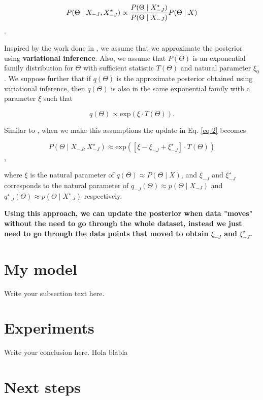 \documentclass{article}
\begin{document}
\begin{equation}
\label{eq-2}
P(\Theta \mid X_{-J}, X_{-J}^{\star}) \propto 
\frac{P(\Theta \mid X_{-J}^{\star})}{P(\Theta \mid X_{-J})}P(\Theta \mid X) \\
\end{equation}.

Inspired by the work done in \cite{streaming-variational-bayes}, we assume 
that we approximate the posterior using \textbf{variational inference}. Also,
we assume that $P(\Theta)$ is an exponential family distribution for $\Theta$
with sufficient statistic $T(\Theta)$ and natural parameter $\xi_0$. We suppose
further that if $q(\Theta)$ is the approximate posterior obtained using
variational inference, then $q(\Theta)$ is also in the same exponential family
with a parameter $\xi$ such that

\begin{equation}
\label{exponential-family}
q(\Theta) \propto \text{exp}(\xi \cdot T(\Theta)).
\end{equation}

Similar to \cite{streaming-variational-bayes}, when we make this assumptions
the update in Eq. \ref{eq-2} becomes

\begin{equation}
P(\Theta \mid X_{-J}, X_{-J}^{\star}) \approx \text{exp}([\xi - \xi_{-J} + \xi_{-J}^{\star}] \cdot T(\Theta))
\end{equation},

where $\xi$ is the natural parameter of $q(\Theta) \approx P(\Theta \mid X)$, and
$\xi_{-J}$ and $\xi_{-J}^{\star}$ corresponds to the natural parameter of 
$q_{-J}(\Theta) \approx p(\Theta \mid X_{-J})$ and 
$q_{-J}^{\star}(\Theta) \approx p(\Theta \mid X_{-J}^{\star})$ respectively.

\textbf{Using this approach, we can update the posterior when data "moves" without
the need to go through the whole dataset, instead we just need to go through
the data points that moved to obtain $\xi_{-J}$ and $\xi_{-J}^{\star}$.}

\section{My model}
Write your subsection text here.

\section{Experiments}
Write your conclusion here.
Hola \cite{streaming-variational-bayes} blabla

\section{Next steps}


 
\end{document}
